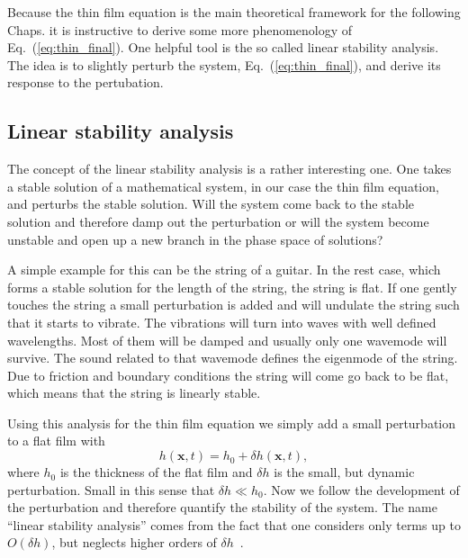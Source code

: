 Because the thin film equation is the main theoretical framework for the following Chaps. it is instructive to derive some more phenomenology of Eq.~(\ref{eq:thin_final}).
One helpful tool is the so called linear stability analysis. 
The idea is to slightly perturb the system, Eq.~(\ref{eq:thin_final}), and derive its response to the pertubation.

\subsection{Linear stability analysis}
\label{susbsec:Lin_stab}
The concept of the linear stability analysis is a rather interesting one.
One takes a stable solution of a mathematical system, in our case the thin film equation, and perturbs the stable solution.
Will the system come back to the stable solution and therefore damp out the perturbation or will the system become unstable and open up a new branch in the phase space of solutions?

A simple example for this can be the string of a guitar.
In the rest case, which forms a stable solution for the length of the string, the string is flat.
If one gently touches the string a small perturbation is added and will undulate the string such that it starts to vibrate.
The vibrations will turn into waves with well defined wavelengths. 
Most of them will be damped and usually only one wavemode will survive.
The sound related to that wavemode defines the eigenmode of the string.
Due to friction and boundary conditions the string will come go back to be flat, which means that the string is linearly stable.

Using this analysis for the thin film equation we simply add a small perturbation to a flat film with
\begin{equation}\label{eq:lin_stab_delta}
    h(\mathbf{x},t) = h_0 + \delta h(\mathbf{x},t),
\end{equation}
where $h_0$ is the thickness of the flat film and $\delta h$ is the small, but dynamic perturbation.
Small in this sense that $\delta h \ll h_0$.
Now we follow the development of the perturbation and therefore quantify the stability of the system.
The name ``linear stability analysis'' comes from the fact that one considers only terms up to $O(\delta h)$, but neglects higher orders of $\delta h$~\cite{laugesenLinearStabilitySteady2000}.

